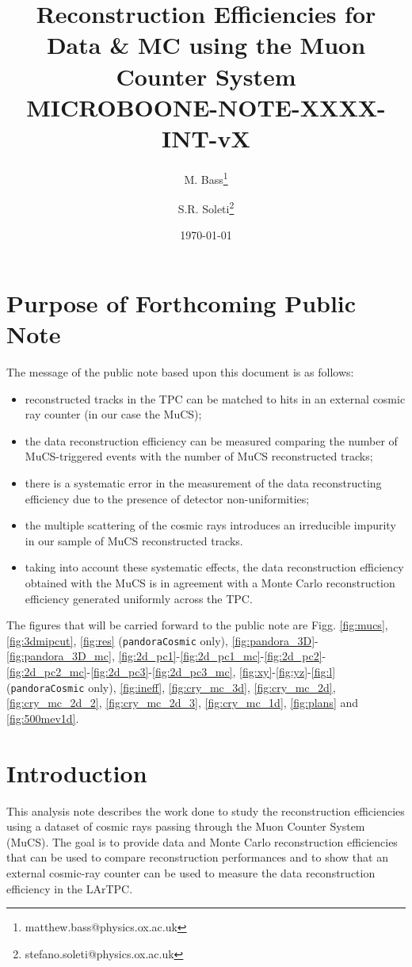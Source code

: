 \documentclass[a4paper]{scrartcl}
\title{Reconstruction Efficiencies for Data \& MC using the Muon Counter System \\ \vspace{1em} \small{\bf{MICROBOONE-NOTE-XXXX-INT-vX}}}
\author[1]{M. Bass\thanks{matthew.bass@physics.ox.ac.uk}}
\author[1]{S.R. Soleti\thanks{stefano.soleti@physics.ox.ac.uk}}
\affil[1]{\emph{\small{University of Oxford, Oxford, United Kingdom}}}
\date{\today}
\begin{document}
\maketitle

\setcounter{section}{-1}

\section{Purpose of Forthcoming Public Note}

The message of the public note based upon this document is as follows:

\begin{itemize}
\item reconstructed tracks in the TPC can be matched to hits in an external cosmic ray counter (in our case the MuCS);
\item the data reconstruction efficiency can be measured comparing the number of MuCS-triggered events with the number of MuCS reconstructed tracks;
\item there is a systematic error in the measurement of the data reconstructing efficiency due to the presence of detector non-uniformities;
\item the multiple scattering of the cosmic rays introduces an irreducible impurity in our sample of MuCS reconstructed tracks.
\item taking into account these systematic effects, the data reconstruction efficiency obtained with the MuCS is in agreement with a Monte Carlo reconstruction efficiency generated uniformly across the TPC.

\end{itemize}

The figures that will be carried forward to the public note are Figg. \ref{fig:mucs}, \ref{fig:3dmipcut}, \ref{fig:res} (\texttt{pandoraCosmic} only), \ref{fig:pandora_3D}-\ref{fig:pandora_3D_mc}, \ref{fig:2d_pc1}-\ref{fig:2d_pc1_mc}-\ref{fig:2d_pc2}-\ref{fig:2d_pc2_mc}-\ref{fig:2d_pc3}-\ref{fig:2d_pc3_mc}, \ref{fig:xy}-\ref{fig:yz}-\ref{fig:l}  (\texttt{pandoraCosmic} only), \ref{fig:ineff}, \ref{fig:cry_mc_3d}, \ref{fig:cry_mc_2d}, \ref{fig:cry_mc_2d_2}, \ref{fig:cry_mc_2d_3}, \ref{fig:cry_mc_1d}, \ref{fig:plans} and \ref{fig:500mev1d}.

\section{Introduction} 
This analysis note describes the work done to study the reconstruction efficiencies using a dataset of cosmic rays passing through the Muon Counter System (MuCS). 
The goal is to provide data and Monte Carlo reconstruction efficiencies that can be used to compare reconstruction performances and to show that an external cosmic-ray counter can be used to measure the data reconstruction efficiency in the LArTPC.
\end{document}
